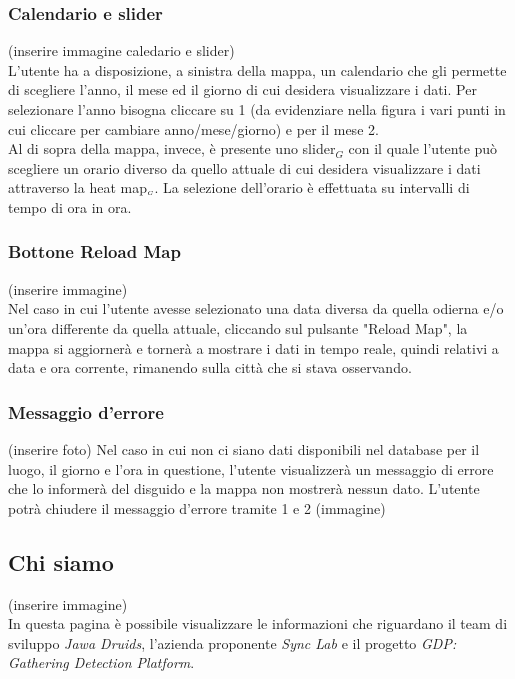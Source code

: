 \subsubsection{Calendario e slider}\label{UtilizzoDiGDPGatheringDetecionPlatformContenutoCentralePaginaInizialeHomeCalendarioESlider}
(inserire immagine caledario e slider) \\
L'utente ha a disposizione, a sinistra della mappa, un calendario che gli permette di scegliere l'anno, il mese ed il giorno di cui desidera visualizzare i dati. Per selezionare l'anno bisogna cliccare su 1 (da evidenziare nella figura i vari punti in cui cliccare per cambiare anno/mese/giorno) e per il mese 2.
\\
Al di sopra della mappa, invece, è presente uno slider$_G$ con il quale l'utente può scegliere un orario diverso da quello attuale di cui desidera visualizzare i dati attraverso la heat map$_{\scaleto{G}{3pt}}$. La selezione dell'orario è effettuata su intervalli di tempo di ora in ora. 

\subsubsection{Bottone Reload Map} \label{UtilizzoDiGDPGatheringDetecionPlatformContenutoCentralePaginaInizialeHomeBottoneReloadMap}
(inserire immagine)\\
Nel caso in cui l'utente avesse selezionato una data diversa da quella odierna e/o un'ora differente da quella attuale, cliccando sul pulsante "Reload Map", la mappa si aggiornerà e tornerà a mostrare i dati in tempo reale, quindi relativi a data e ora corrente, rimanendo sulla città che si stava osservando. 
\subsubsection{Messaggio d'errore} \label{UtilizzoDiGDPGatheringDetecionPlatformContenutoCentralePaginaInizialeHomeMessaggioDiErrore}
(inserire foto)
Nel caso in cui non ci siano dati disponibili nel database per il luogo, il giorno e l'ora in questione, l'utente visualizzerà un messaggio di errore che lo informerà del disguido e la mappa non mostrerà nessun dato. L'utente potrà chiudere il messaggio d'errore tramite 1 e 2 (immagine)
\subsection{Chi siamo} \label{UtilizzoDiGDPGatheringDetecionPlatformContenutoCentraleChiSiamo}
(inserire immagine)\\
In questa pagina è possibile visualizzare le informazioni che riguardano il team di sviluppo \textit{Jawa Druids}, l'azienda proponente \textit{Sync Lab} e il progetto \textit{GDP: Gathering Detection Platform}. 

